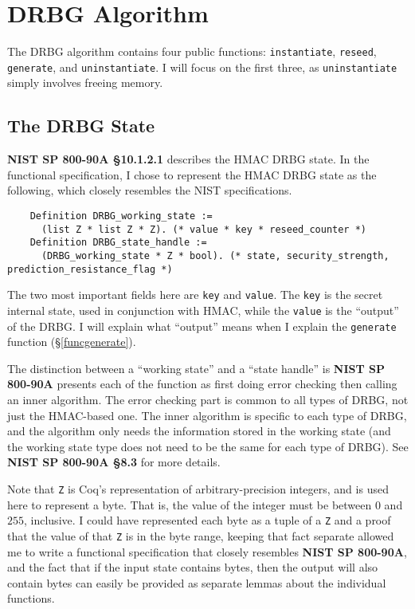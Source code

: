 \documentclass[pageno]{jpaper}
\newcommand{\stdtitle}[1]{\textbf{#1}}
\begin{document}
\section{DRBG Algorithm}
The DRBG algorithm contains four public functions: \lstinline{instantiate}, \lstinline{reseed}, \lstinline{generate}, and \lstinline{uninstantiate}. I will focus on the first three, as \lstinline{uninstantiate} simply involves freeing memory.

\subsection{The DRBG State}

\stdtitle{NIST SP 800-90A \S 10.1.2.1} describes the HMAC DRBG state. In the functional specification, I chose to represent the HMAC DRBG state as the following, which closely resembles the NIST specifications.

\begin{lstlisting}
    Definition DRBG_working_state :=
      (list Z * list Z * Z). (* value * key * reseed_counter *)
    Definition DRBG_state_handle :=
      (DRBG_working_state * Z * bool). (* state, security_strength, prediction_resistance_flag *)
\end{lstlisting}

The two most important fields here are \lstinline{key} and \lstinline{value}. The \lstinline{key} is the secret internal state, used in conjunction with HMAC, while the \lstinline{value} is the “output” of the DRBG. I will explain what “output” means when I explain the \lstinline{generate} function (\S \ref{funcgenerate}).

The distinction between a “working state” and a “state handle” is \stdtitle{NIST SP 800-90A} presents each of the function as first doing error checking then calling an inner algorithm. The error checking part is common to all types of DRBG, not just the HMAC-based one. The inner algorithm is specific to each type of DRBG, and the algorithm only needs the information stored in the working state (and the working state type does not need to be the same for each type of DRBG). See \stdtitle{NIST SP 800-90A \S 8.3} for more details.

Note that \lstinline{Z} is Coq’s representation of arbitrary-precision integers, and is used here to represent a byte. That is, the value of the integer must be between $0$ and $255$, inclusive. I could have represented each byte as a tuple of a \lstinline{Z} and a proof that the value of that \lstinline{Z} is in the byte range, keeping that fact separate allowed me to write a functional specification that closely resembles \stdtitle{NIST SP 800-90A}, and the fact that if the input state contains bytes, then the output will also contain bytes can easily be provided as separate lemmas about the individual functions.
\end{document}
